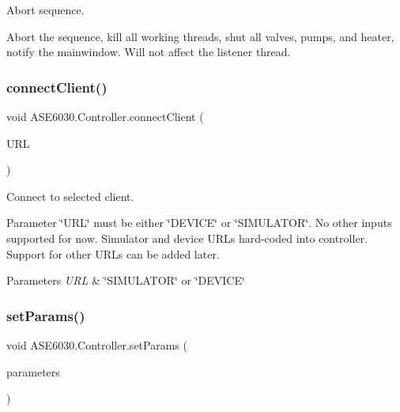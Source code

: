 Abort sequence. 

Abort the sequence, kill all working threads, shut all valves, pumps, and heater, notify the mainwindow. Will not affect the listener thread. \mbox{\label{class_a_s_e6030_1_1_controller_a5f84e69b4885c561df4bc177fcc54d40}} 
\subsubsection{\texorpdfstring{connect\+Client()}{connectClient()}}
{\footnotesize\ttfamily void A\+S\+E6030.\+Controller.\+connect\+Client (\begin{DoxyParamCaption}\item[{string}]{U\+RL }\end{DoxyParamCaption})\hspace{0.3cm}{\ttfamily [inline]}}



Connect to selected client. 

Parameter \char`\"{}\+U\+R\+L\char`\"{} must be either \char`\"{}\+D\+E\+V\+I\+C\+E\char`\"{} or \char`\"{}\+S\+I\+M\+U\+L\+A\+T\+O\+R\char`\"{}. No other inputs supported for now. Simulator and device U\+R\+Ls hard-\/coded into controller. Support for other U\+R\+Ls can be added later. 
\begin{DoxyParams}{Parameters}
{\em U\+RL} & \char`\"{}\+S\+I\+M\+U\+L\+A\+T\+O\+R\char`\"{} or \char`\"{}\+D\+E\+V\+I\+C\+E\char`\"{}\\
\hline
\end{DoxyParams}
\mbox{\label{class_a_s_e6030_1_1_controller_afee09ba01da47aa772ce3da642e08e47}} 
\subsubsection{\texorpdfstring{set\+Params()}{setParams()}}
{\footnotesize\ttfamily void A\+S\+E6030.\+Controller.\+set\+Params (\begin{DoxyParamCaption}\item[{\hyperlink{class_a_s_e6030_1_1_sequence_parameters}{Sequence\+Parameters}}]{parameters }\end{DoxyParamCaption})\hspace{0.3cm}{\ttfamily [inline]}}

